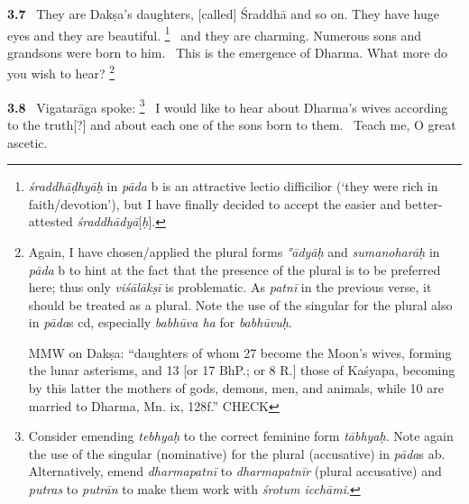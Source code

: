 \documentclass{article}
\newcommand{\skt}[1]{\textit{#1}}
\begin{document}
\textbf{3.7}%
\ They are Dakṣa's daughters, [called] Śraddhā and so on. They have huge eyes and they are beautiful.%
\footnote{\skt{śraddhāḍhyāḥ} in \skt{pāda} b is an attractive lectio difficilior (`they were rich in faith/devotion'), but I have finally                 decided to accept the easier and better-attested \skt{śraddhādyā}[\skt{ḥ}]. }%
\ and they are charming. Numerous sons and grandsons were born to him.%
\ This is the emergence of Dharma. What more do you wish to hear?%
\footnote{Again, I have chosen/applied the plural forms \skt{°ādyāḥ} and \skt{sumanoharāḥ} in \skt{pāda} b to hint at the fact                        that the presence of the plural is to be preferred here; thus only \skt{viśālākṣī} is                         problematic. As \skt{patnī} in the previous verse, it should be treated as a plural.        Note the use of the singular for the plural also in \skt{pāda}s cd, especially \skt{babhūva ha} for \skt{babhūvuḥ}.         

        MMW on Dakṣa:        ``daughters of whom 27 become the Moon's wives, forming the lunar asterisms, and 13         [or 17 BhP.; or 8 R.] those of Kaśyapa, becoming by this latter the mothers         of gods, demons, men, and animals, while 10 are married to Dharma, Mn. ix, 128f.'' CHECK }%


\textbf{3.8}%
\ Vigatarāga spoke:%
\footnote{Consider emending \skt{tebhyaḥ} to the correct feminine form \skt{tābhyaḥ}.                Note again the use of the singular (nominative) for the plural (accusative) in \skt{pāda}s ab.                Alternatively, emend \skt{dharmapatnī} to \skt{dharmapatnīr} (plural accusative) and                 \skt{putras} to \skt{putrān} to make them work with \skt{śrotum icchāmi}. }%
\ I would like to hear about Dharma's wives according to the truth[?] and about each one of the sons born to them.%
\         Teach me, O great ascetic.%
\end{document}
